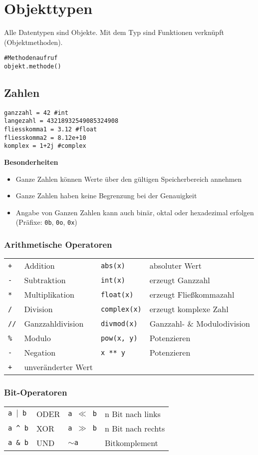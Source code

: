 \chapter{Objekttypen}
Alle Datentypen sind Objekte. Mit dem Typ sind Funktionen verknüpft (Objektmethoden).
\begin{lstlisting}
#Methodenaufruf
objekt.methode()
\end{lstlisting}
\section{Zahlen}
\begin{lstlisting}
ganzzahl = 42 #int
langezahl = 43218932549085324908
fliesskomma1 = 3.12 #float
fliesskomma2 = 8.12e+10
komplex = 1+2j #complex
\end{lstlisting}
\textbf{Besonderheiten}
\begin{itemize}
\item Ganze Zahlen können Werte über den gültigen Speicherbereich annehmen
\item Ganze Zahlen haben keine Begrenzung bei der Genauigkeit
\item Angabe von Ganzen Zahlen kann auch binär, oktal oder hexadezimal erfolgen (Präfixe: \texttt{0b}, \texttt{0o}, \texttt{0x})
\end{itemize}
\subsection{Arithmetische Operatoren}
\begin{tabular}{lp{4cm}lp{6cm}}
\texttt{+}	&Addition	&\texttt{abs(x)}	&absoluter Wert\\
\texttt{-}	&Subtraktion	&\texttt{int(x)}	&erzeugt Ganzzahl\\
\texttt{*}	&Multiplikation	&\texttt{float(x)}	&erzeugt Fließkommazahl\\
\texttt{/}	&Division	&\texttt{complex(x)}	&erzeugt komplexe Zahl\\
\texttt{//}	&Ganzzahldivision	&\texttt{divmod(x)}	&Ganzzahl- \& Modulodivision\\
\texttt{\%}	&Modulo	&\texttt{pow(x, y)}	&Potenzieren\\
\texttt{-}	&Negation	&\texttt{x ** y}	&Potenzieren\\
\texttt{+}	&unveränderter Wert	&	&
\end{tabular}
\subsection{Bit-Operatoren}
\begin{tabular}{lp{4cm}lp{6cm}}
\texttt{a $\mid$ b}	&ODER	&\texttt{a $\ll$ b}	&n Bit nach links\\
\texttt{a \^{} b}	&XOR	&\texttt{a $\gg$ b}	&n Bit nach rechts\\
\texttt{a \& b}	&UND	&\texttt{$\sim$a}	&Bitkomplement\\
\end{tabular}
